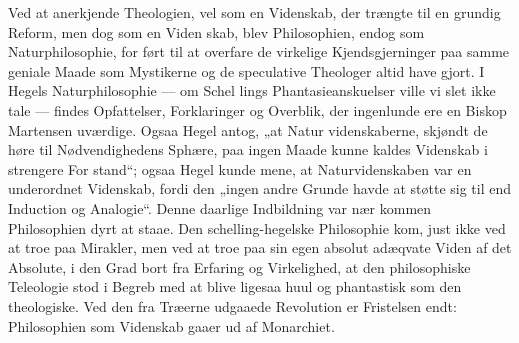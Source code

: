 \documentclass[12pt]{book}
\newcommand{\opage}[1]{\marginnote{\footnotesize\textit{[#1]}}}
\begin{document}
Ved at anerkjende Theologien, vel som en Videnskab,
der trængte til en grundig Reform, men dog som en Viden\-%
skab, blev Philosophien, endog som Naturphilosophie, for\-%
ført til at overfare de virkelige Kjendsgjerninger paa samme
geniale Maade som Mystikerne og de speculative Theologer
altid have gjort. I Hegels Naturphilosophie --- om Schel\-%
lings Phantasieanskuelser ville vi slet ikke tale --- findes
Opfattelser, Forklaringer og Overblik, der ingenlunde ere en
Biskop Martensen uværdige. Ogsaa Hegel antog, „at Natur\-%
videnskaberne, skjøndt de høre til Nødvendighedens Sphære,
paa ingen Maade kunne kaldes Videnskab i strengere For\-%
stand“; ogsaa Hegel kunde mene, at Naturvidenskaben var
en underordnet Videnskab, fordi den „ingen andre Grunde
\opage{111}\setcounter{footnote}{0}%
havde at støtte sig til end Induction og Analogie“. Denne
daarlige Indbildning var nær kommen Philosophien dyrt at
staae. Den schelling-hegelske Philosophie kom, just ikke ved
at troe paa Mirakler, men ved at troe paa sin egen absolut
adæqvate Viden af det Absolute, i den Grad bort fra Erfaring
og Virkelighed, at den philosophiske Teleologie stod i Begreb
med at blive ligesaa huul og phantastisk som den theologiske.
Ved den fra Træerne udgaaede Revolution er Fristelsen
endt: Philosophien som Videnskab gaaer ud af Monarchiet.
\end{document}
